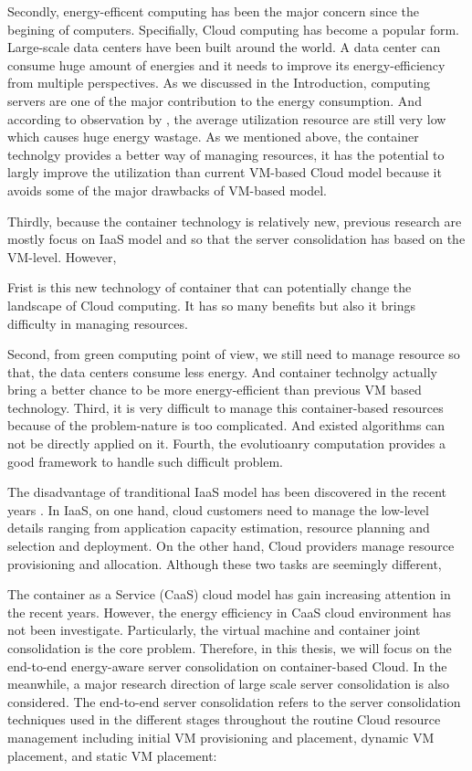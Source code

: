 Secondly, energy-efficent computing has been the major concern since the begining of computers. Specifially, Cloud computing has become a popular form. Large-scale data centers have been built around the world. A data center can consume huge amount of energies and it needs to improve its energy-efficiency from multiple perspectives. As we discussed in the Introduction, computing servers are one of the major contribution to the energy consumption. 
And according to observation by \cite{}, the average utilization resource are still very low which causes huge energy wastage. As we mentioned above, the container technolgy provides a better way of managing resources, it has the potential to largly improve the utilization than current VM-based Cloud model because it avoids some of the major drawbacks of VM-based model. 

Thirdly, because the container technology is relatively new, previous research are mostly focus on IaaS model and so that the server consolidation has based on the VM-level. However,   

Frist is this new technology of container that can potentially change the landscape of
Cloud computing. It has so many benefits but also it brings difficulty in managing resources.

Second, from green computing point of view, we still need to manage resource so that, the 
data centers consume less energy. And container technolgy actually bring a better chance to
be more energy-efficient than previous VM based technology.
Third, it is very difficult to manage this container-based resources because of the problem-nature is too complicated. And existed algorithms can not be directly applied on it.
Fourth, the evolutioanry computation provides a good framework to handle such difficult problem.


The disadvantage of tranditional IaaS model has been discovered in the recent years \cite{Mann:2016hx}.
In IaaS, on one hand, cloud customers need to manage the low-level details ranging from application capacity estimation,
resource planning and selection and deployment. 
On the other hand, Cloud providers manage resource provisioning and allocation. 
Although these two tasks are seemingly different, 


The container as a Service (CaaS) cloud model has gain increasing attention in the recent years.
However, the energy efficiency in CaaS cloud environment has not been investigate. 
Particularly, the virtual machine and container joint consolidation is the core problem.
Therefore, in this thesis, we will focus on the end-to-end energy-aware server consolidation on container-based
Cloud. In the meanwhile,  a major research direction of large scale server consolidation is also considered. 
The end-to-end server consolidation refers to the server consolidation techniques used
in the different stages throughout the routine Cloud resource management including  initial VM provisioning and placement, dynamic VM placement, and static VM placement:
